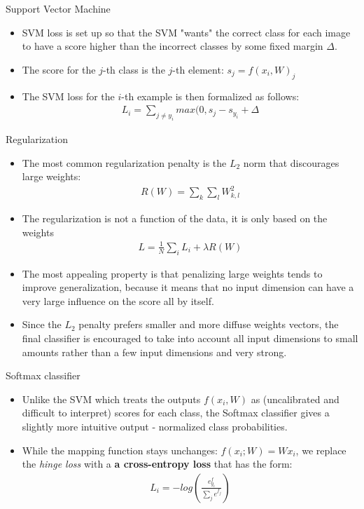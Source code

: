 \documentclass[10pt,mathserif]{beamer}
\begin{document}
\begin{frame}{Support Vector Machine}
\begin{itemize}
\item SVM loss is set up so that the SVM "wants" the correct class for each image to have a score 
higher than the incorrect classes by some fixed margin $\Delta$.
\item The score for the $j$-th class is the $j$-th element: $s_j = f(x_i, W)_j$
\item The SVM loss for the $i$-th example is then formalized as follows:
\begin{align}
L_i = \sum_{j\neq y_i} max(0, s_j - s_{y_i} + \Delta
\end{align}
\end{itemize}
\end{frame}

\begin{frame}{Regularization}
\begin{itemize}
\item The most common regularization penalty is the $L_2$ norm that discourages large weights:
\begin{align}
R(W) = \sum_{k}\sum_{l}W_{k,l}^2
\end{align}
\item The regularization is not a function of the data, it is only based on the weights
\begin{align}
L = \frac{1}{N} \sum_i L_i + \lambda R(W)
\end{align} 
\item The most appealing property is that penalizing large weights tends to improve generalization,
because it means that no input dimension can have a very large influence on the score all by itself.
\item Since the $L_2$ penalty prefers smaller and more diffuse weights vectors, the final classifier 
is encouraged to take into account all input dimensions to small amounts rather than a few input dimensions and very strong.
\end{itemize}
\end{frame}


\begin{frame}{Softmax classifier}
\begin{itemize}
\item Unlike the SVM which treats the outputs $f(x_i, W)$ as (uncalibrated and difficult to interpret)
scores for each class, the Softmax classifier gives a slightly more intuitive output - normalized class probabilities.
\item While the mapping function stays unchanges: $f(x_i; W) = Wx_i$, we replace the \textit{hinge loss} with a \textbf{a cross-entropy loss} that has the form:
\begin{align}
L_i = -log(\frac{e^f_{y_i}}{\sum_j e^{f_j}})
\end{align} 
\end{itemize}
\end{frame}
\end{document}
